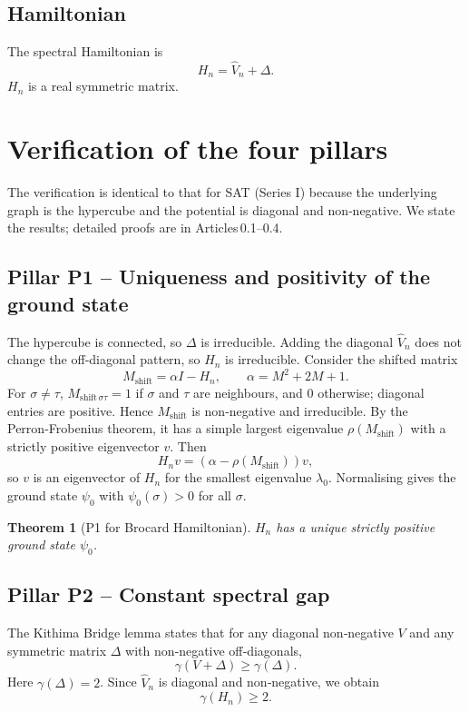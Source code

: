 \documentclass[11pt,a4paper]{article}
\newtheorem{theorem}{Theorem}[section]
\begin{document}
\subsection{Hamiltonian}
The spectral Hamiltonian is
\[
H_n = \hat{V}_n + \Delta.
\]
$H_n$ is a real symmetric matrix.

\section{Verification of the four pillars}

The verification is identical to that for SAT (Series I) because the underlying graph is the hypercube and the potential is diagonal and non‑negative. We state the results; detailed proofs are in Articles 0.1–0.4.

\subsection{Pillar P1 – Uniqueness and positivity of the ground state}
The hypercube is connected, so $\Delta$ is irreducible. Adding the diagonal $\hat{V}_n$ does not change the off‑diagonal pattern, so $H_n$ is irreducible. Consider the shifted matrix
\[
M_{\text{shift}} = \alpha I - H_n,\qquad \alpha = M^2 + 2M + 1.
\]
For $\sigma\neq\tau$, $M_{\text{shift}\,\sigma\tau} = 1$ if $\sigma$ and $\tau$ are neighbours, and $0$ otherwise; diagonal entries are positive. Hence $M_{\text{shift}}$ is non‑negative and irreducible. By the Perron‑Frobenius theorem, it has a simple largest eigenvalue $\rho(M_{\text{shift}})$ with a strictly positive eigenvector $v$. Then
\[
H_n v = (\alpha - \rho(M_{\text{shift}})) v,
\]
so $v$ is an eigenvector of $H_n$ for the smallest eigenvalue $\lambda_0$. Normalising gives the ground state $\psi_0$ with $\psi_0(\sigma) > 0$ for all $\sigma$.

\begin{theorem}[P1 for Brocard Hamiltonian]
$H_n$ has a unique strictly positive ground state $\psi_0$.
\end{theorem}

\subsection{Pillar P2 – Constant spectral gap}
The Kithima Bridge lemma states that for any diagonal non‑negative $V$ and any symmetric matrix $\Delta$ with non‑negative off‑diagonals,
\[
\gamma(V + \Delta) \ge \gamma(\Delta).
\]
Here $\gamma(\Delta) = 2$. Since $\hat{V}_n$ is diagonal and non‑negative, we obtain
\[
\gamma(H_n) \ge 2.
\]
\end{document}
